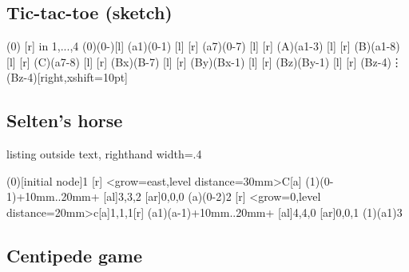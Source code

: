 \subsection{Tic-tac-toe (sketch)}

\begin{tcblisting}{}
\begin{istgame}[scale=1.8,font=\tiny]
\xtdistance{20mm}{7mm}
\istroot(0) \istb \istb \istb \istb \istb \istb{\dots} \istb \istb {}[r] \endist
\foreach \x in {1,...,4}
{\xtActionLabel(0)(0-\x){\x}[l]}
\xtdistance{10mm}{3mm}
\istroot(a1)(0-1) [l] \istb \istb \istb \istb \istb \istb {}[r] \endist
\istroot(a7)(0-7) [l] \istb \istb \istb \istb \istb \istb {}[r] \endist
\xtdistance{10mm}{2mm}
\istroot(A)(a1-3) [l] \istb \istb \istb \istb \istb {}[r] \endist
\istroot(B)(a1-8) [l] \istb \istb \istb \istb \istb {}[r] \endist
\istroot(C)(a7-8) [l] \istb \istb \istb \istb \istb {}[r] \endist
\istroot(Bx)(B-7) [l] \istb \istb \istb \istb {}[r] \endist
\istroot(By)(Bx-1) [l] \istb \istb \istb {}[r]  \endist
\istroot(Bz)(By-1) [l] \istb \istb {}[r]  \endist
\xtPayoff(Bz-4){\vdots}    \xtPayoff(Bz-4){\cdots}[right,xshift=10pt]
\end{istgame}
\end{tcblisting}


\subsection{Selten's horse}

\begin{tcblisting}{listing outside text, righthand width=.4\linewidth}
\begin{istgame}
\xtdistance{8mm}{16mm}
\istroot[-45](0)[initial node]{1}
  [r]
  \istb<grow=east,level distance=30mm>{C}[a]
  \endist
\istroot(1)(0-1)+10mm..20mm+
  [al]{3,3,2}
  [ar]{0,0,0}
  \endist
\istroot[-45](a)(0-2){2}
  [r]
  \istb<grow=0,level distance=20mm>{c}[a]{1,1,1}[r]
  \endist
\istroot(a1)(a-1)+10mm..20mm+
  [al]{4,4,0}
  [ar]{0,0,1}
  \endist
\xtInfoset(1)(a1){3}
\end{istgame}
\end{tcblisting}


\subsection{Centipede game}

